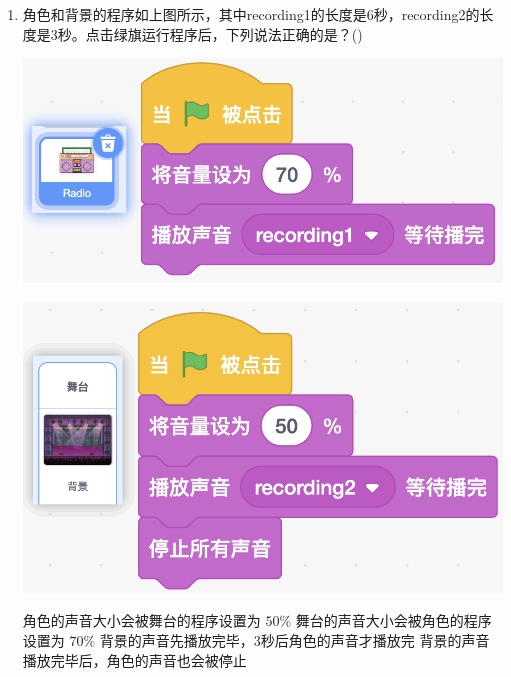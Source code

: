 \documentclass[10pt, a4paper]{article}
\newcommand{\hq}{\hfill(\qquad)}
\begin{document}
\begin{enumerate}
        \item 角色和背景的程序如上图所示，其中recording1的长度是6秒，recording2的长度是3秒。点击绿旗运行程序后，下列说法正确的是？\hq
        
        \begin{minipage}{.2\textwidth}
            \centering
            \includegraphics[width=\textwidth]{figure/17-1.png}
        \end{minipage}
        \begin{minipage}{.2\textwidth}
            \centering
            \includegraphics[width=\textwidth]{figure/17-2.png}
        \end{minipage}
        \begin{minipage}{.53\textwidth}
            \begin{tasks}
                \task 角色的声音大小会被舞台的程序设置为 $50\%$
                \task 舞台的声音大小会被角色的程序设置为 $70\%$
                \task 背景的声音先播放完毕，3秒后角色的声音才播放完
                \task 背景的声音播放完毕后，角色的声音也会被停止
            \end{tasks}
        \end{minipage}


\end{enumerate}
\end{document}
